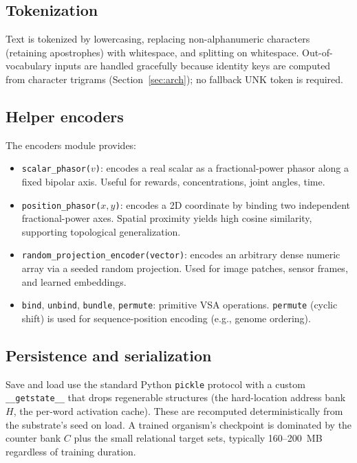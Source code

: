 \documentclass[11pt,a4paper]{article}
\begin{document}
\subsection{Tokenization}
Text is tokenized by lowercasing, replacing non-alphanumeric characters
(retaining apostrophes) with whitespace, and splitting on whitespace.
Out-of-vocabulary inputs are handled gracefully because identity keys are
computed from character trigrams (Section~\ref{sec:arch}); no fallback
UNK token is required.

\subsection{Helper encoders}
The encoders module provides:
\begin{itemize}
  \item \texttt{scalar\_phasor($v$)}: encodes a real scalar as a
    fractional-power phasor along a fixed bipolar axis.
    Useful for rewards, concentrations, joint angles, time.
  \item \texttt{position\_phasor($x, y$)}: encodes a 2D coordinate by
    binding two independent fractional-power axes.  Spatial proximity
    yields high cosine similarity, supporting topological generalization.
  \item \texttt{random\_projection\_encoder(vector)}: encodes an
    arbitrary dense numeric array via a seeded random projection.
    Used for image patches, sensor frames, and learned embeddings.
  \item \texttt{bind}, \texttt{unbind}, \texttt{bundle}, \texttt{permute}:
    primitive VSA operations.  \texttt{permute} (cyclic shift) is
    used for sequence-position encoding (e.g., genome ordering).
\end{itemize}

\subsection{Persistence and serialization}
Save and load use the standard Python \texttt{pickle} protocol with a
custom \texttt{\_\_getstate\_\_} that drops regenerable structures (the
hard-location address bank $H$, the per-word activation cache).  These
are recomputed deterministically from the substrate's seed on load.
A trained organism's checkpoint is dominated by the counter bank $C$
plus the small relational target sets, typically 160--200~MB regardless
of training duration.
\end{document}
